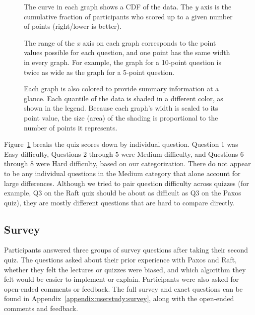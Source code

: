\begin{figure}
{The curve in each graph shows a CDF of the data. The
\emph{y} axis is the cumulative fraction of participants who scored up
to a given number of points (right/lower is better).

The range of the \emph{x} axis on each graph corresponds to the
point values possible for each question, and one point has the same width
in every graph. For example, the graph for a 10-point question is twice
as wide as the graph for a 5-point question.

Each graph is also colored to provide summary information at a glance.
Each quantile of the data is shaded in a different color, as shown
in the legend. Because each graph's width is scaled to its point value,
the size (area) of the shading is proportional to the number of points
it represents.
}
\label{fig:userstudy:breakdown}
\end{figure}

Figure~\ref{fig:userstudy:breakdown} breaks the quiz scores down by individual
question. Question 1 was Easy difficulty, Questions 2 through 5 were
Medium difficulty, and Questions 6 through 8 were Hard difficulty, based
on our categorization. There do not appear to be any individual
questions in the Medium category that alone account for large
differences. Although we tried to pair question difficulty across
quizzes (for example, Q3 on the Raft quiz should be about as difficult
as Q3 on the Paxos quiz), they are mostly different questions that are
hard to compare directly.

\subsection{Survey}
\label{userstudy:results:survey}

Participants answered three groups of survey questions after taking their
second quiz.
The questions asked
about their prior experience with Paxos and Raft,
whether they felt the lectures or quizzes were biased, and which
algorithm they felt would be easier to implement or explain.
Participants were also asked for open-ended comments or feedback.
The full survey and exact questions can be found in
Appendix~\ref{appendix:userstudy:survey}, along with the open-ended
comments and feedback.

